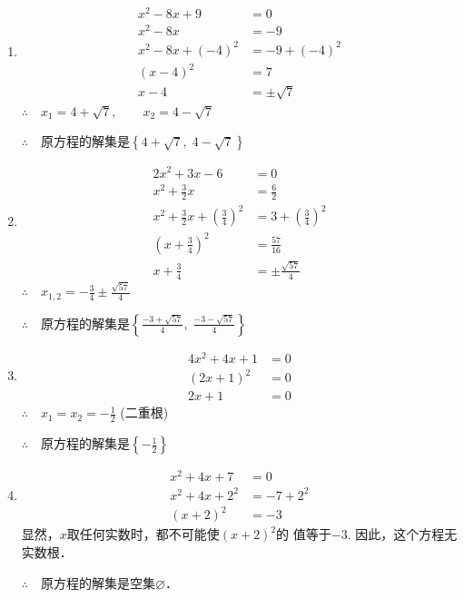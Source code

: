 \begin{solution}
\begin{enumerate}
    \item \begin{align*}
        x^2-8x+9&=0\\
        x^2-8x&=-9\tag{移项}\\
        x^2-8x+(-4)^2&=-9+(-4)^2 \tag{配方}\\
        (x-4)^2&=7\\
        x-4&=\pm\sqrt{7} \tag{平方根的意义}
    \end{align*}
$\therefore\quad x_1=4+\sqrt{7},\qquad x_2=4-\sqrt{7}$

$\therefore\quad $原方程的解集是$\left\{4+\sqrt{7},\; 4-\sqrt{7}\right\}$
    \item \begin{align*}
        2x^2+3x-6&=0\\
x^2+\frac{3}{2}x&=\frac{6}{2}\\
x^2+\frac{3}{2}x+\left(\frac{3}{4}\right)^2&=3+\left(\frac{3}{4}\right)^2\\
\left(x+\frac{3}{4}\right)^2&=\frac{57}{16}\\
x+\frac{3}{4}&=\pm\frac{\sqrt{57}}{4}
    \end{align*}
    $\therefore\quad x_{1,2}=-\frac{3}{4}\pm \frac{\sqrt{57}}{4}$

$\therefore\quad $原方程的解集是$\left\{\frac{-3+\sqrt{57}}{4},\; \frac{-3-\sqrt{57}}{4} \right\}$
    \item \begin{align*}
            4x^2+4x+1&=0\\
            (2x+1)^2&=0\\
            2x+1&=0
    \end{align*}
    $\therefore\quad x_{1}=x_2=-\frac{1}{2}$ (二重根)

$\therefore\quad $原方程的解集是$\left\{-\frac{1}{2}\right\}$
    \item \begin{align*}
        x^2+4x+7&=0\\
        x^2+4x+2^2&=-7+2^2\\
(x+2)^2&=-3
    \end{align*}
    显然，$x$取任何实数时，都不可能使$(x+2)^2$的
值等于$-3$. 因此，这个方程无实数根．

$\therefore\quad$原方程的解集是空集$\varnothing$．

\end{enumerate}
\end{solution}

